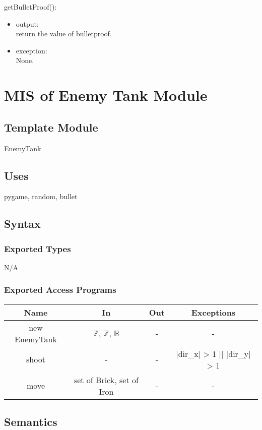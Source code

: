 \documentclass[12pt, titlepage]{article}
\begin{document}
	    getBulletProof():
	    \begin{itemize}
	    \item output:\\return the value of bulletproof.
	    \item exception:\\None.
	    \end{itemize}
	    
	    
	    
\section{MIS of Enemy Tank Module}
        \subsection{Template Module}
        EnemyTank
        \subsection{Uses}
        pygame, random, bullet
		\subsection{Syntax}
		\subsubsection{Exported Types}
        N/A
		\subsubsection{Exported Access Programs}
		
		\begin{table}[!htbp]
		\begin{tabular}{|c|c|c|c|}
			\hline
			Name & In & Out & Exceptions \\ \hline
			new EnemyTank & $\mathbb{Z}$, $\mathbb{Z}$, $\mathbb{B}$ & - & - \\ \hline
			shoot & - & - & |dir\_x| > 1 || |dir\_y| > 1 \\ \hline
			move & set of Brick, set of Iron & - & - \\ \hline
		\end{tabular}
	\end{table}
		
		\subsection{Semantics}
\end{document}
